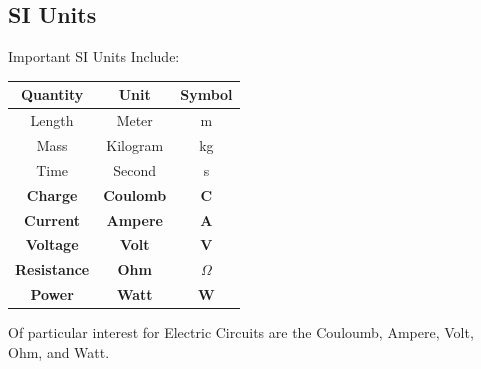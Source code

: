 \documentclass{article}
\begin{document}
\subsection{SI Units}
Important SI Units Include:
\begin{center}
\begin{tabular}{| c | c | c |}
\hline
Quantity & Unit & Symbol \\
\hline
\hline
Length & Meter & m \\
\hline
Mass & Kilogram & kg \\
\hline
Time & Second & s \\
\hline
\textbf{Charge} & \textbf{Coulomb} & \textbf{C} \\
\hline
\textbf{Current} & \textbf{Ampere} & \textbf{A} \\
\hline
\textbf{Voltage} & \textbf{Volt} & \textbf{V} \\
\hline
\textbf{Resistance} & \textbf{Ohm} & \textbf{$\Omega$} \\
\hline
\textbf{Power} & \textbf{Watt} & \textbf{W} \\
\hline
\end{tabular}
\end{center}
Of particular interest for Electric Circuits are the Couloumb, Ampere, Volt, Ohm, and Watt.
\end{document}
